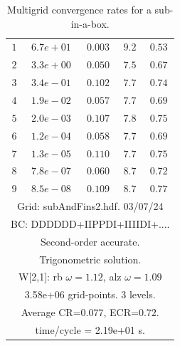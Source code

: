 \begin{table}[hbt]
\begin{center}
{\begin{tabular}{|c|c|c|c|c|}
 $ 1$  & $ 6.7e+01$ & $0.003$ & $ 9.2$ & $0.53$ \\ 
 $ 2$  & $ 3.3e+00$ & $0.050$ & $ 7.5$ & $0.67$ \\ 
 $ 3$  & $ 3.4e-01$ & $0.102$ & $ 7.7$ & $0.74$ \\ 
 $ 4$  & $ 1.9e-02$ & $0.057$ & $ 7.7$ & $0.69$ \\ 
 $ 5$  & $ 2.0e-03$ & $0.107$ & $ 7.8$ & $0.75$ \\ 
 $ 6$  & $ 1.2e-04$ & $0.058$ & $ 7.7$ & $0.69$ \\ 
 $ 7$  & $ 1.3e-05$ & $0.110$ & $ 7.7$ & $0.75$ \\ 
 $ 8$  & $ 7.8e-07$ & $0.060$ & $ 8.7$ & $0.72$ \\ 
 $ 9$  & $ 8.5e-08$ & $0.109$ & $ 8.7$ & $0.77$ \\ 
\hline 
\multicolumn{5}{|c|}{Grid: subAndFins2.hdf. 03/07/24} \\
\multicolumn{5}{|c|}{BC: DDDDDD+IIPPDI+IIIIDI+....}  \\
\multicolumn{5}{|c|}{Second-order accurate.}  \\
\multicolumn{5}{|c|}{Trigonometric solution.}  \\
\multicolumn{5}{|c|}{W[2,1]: rb $\omega=1.12$, alz $\omega=1.09$}  \\
\multicolumn{5}{|c|}{3.58e+06 grid-points. 3 levels.}  \\
\multicolumn{5}{|c|}{Average CR=$0.077$, ECR=$0.72$.}  \\
\multicolumn{5}{|c|}{time/cycle = 2.19e+01 s.}  \\
\hline 
\end{tabular}
} %
\end{center}
\caption{Multigrid convergence rates for a sub-in-a-box.}
\label{fig:smoothBox}
\end{table}







